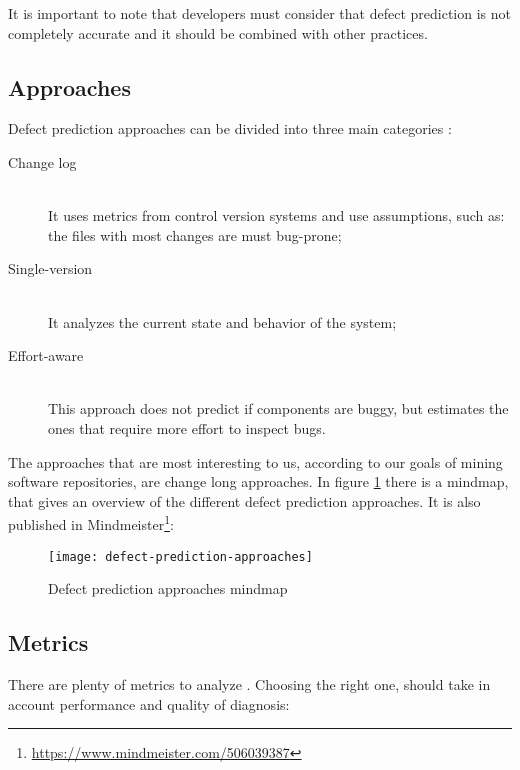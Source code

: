 It is important to note that developers must consider that defect prediction is not completely accurate and it should be combined with other practices. 

\subsection{Approaches}
Defect prediction approaches can be divided into three main categories \cite{D'Ambros:2012:EDP:2318097.2318149}:


\begin{description}
  \item[Change log] \hfill \\
  It uses metrics from control version systems and use assumptions, such as: the files with most changes are must bug-prone;
  \item[Single-version] \hfill \\
  It analyzes the current state and behavior of the system;
  \item[Effort-aware]  \hfill \\  This approach does not predict if components are buggy, but estimates the ones that require more effort to inspect bugs.
\end{description}

The approaches that are most interesting to us, according to our goals of mining software repositories, are change long approaches. In figure \ref{figure:defectmindmap} there is a mindmap, that gives an overview of the different defect prediction approaches. It is also published in Mindmeister\footnote{\url{https://www.mindmeister.com/506039387}}: 

\begin{figure}[H]
    \begin{center}
        \texttt{[image: defect-prediction-approaches]}
        \caption{Defect prediction approaches mindmap}
        \label{figure:defectmindmap}
    \end{center}
\end{figure}

\subsection{Metrics}
There are plenty of metrics to analyze \cite{D'Ambros:2012:EDP:2318097.2318149}. Choosing the right one, should take in account performance and quality of diagnosis:

